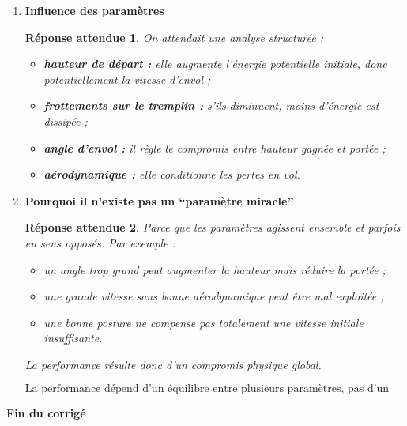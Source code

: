 \documentclass[11pt,a4paper]{article}
\newtheorem*{reponseattendue}{Réponse attendue}
\begin{document}
\begin{enumerate}[label=\textbf{3.\arabic*}, resume, leftmargin=1.6em]

\item \textbf{Influence des paramètres}

\begin{reponseattendue}
On attendait une analyse structurée :
\begin{itemize}
    \item \textbf{hauteur de départ :} elle augmente l’énergie potentielle initiale, donc potentiellement la vitesse d’envol ;
    \item \textbf{frottements sur le tremplin :} s’ils diminuent, moins d’énergie est dissipée ;
    \item \textbf{angle d’envol :} il règle le compromis entre hauteur gagnée et portée ;
    \item \textbf{aérodynamique :} elle conditionne les pertes en vol.
\end{itemize}
\end{reponseattendue}

\item \textbf{Pourquoi il n’existe pas un “paramètre miracle”}

\begin{reponseattendue}
Parce que les paramètres agissent ensemble et parfois en sens opposés.  
Par exemple :
\begin{itemize}
    \item un angle trop grand peut augmenter la hauteur mais réduire la portée ;
    \item une grande vitesse sans bonne aérodynamique peut être mal exploitée ;
    \item une bonne posture ne compense pas totalement une vitesse initiale insuffisante.
\end{itemize}
La performance résulte donc d’un compromis physique global.
\end{reponseattendue}

\[
\boxed{\text{La performance dépend d’un équilibre entre plusieurs paramètres, pas d’un seul.}}
\]

\end{enumerate}

\vspace{0.8em}
\begin{center}
\textbf{Fin du corrigé}
\end{center}
\end{document}
